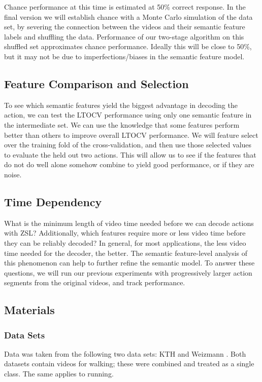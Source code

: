 \documentclass{article}
\begin{document}
Chance performance at this time is estimated at 50\% correct response. In the final version we will establish chance with a Monte Carlo simulation of the data set, by severing the connection between the videos and their semantic feature labels and shuffling the data. Performance of our two-stage algorithm on this shuffled set approximates chance performance. Ideally this will be close to 50\%, but it may not be due to imperfections/biases in the semantic feature model.
\label{stats}

\subsection{Feature Comparison and Selection}
To see which semantic features yield the biggest advantage in decoding the action, we can test the LTOCV performance using only one semantic feature in the intermediate set. We can use the knowledge that some features perform better than others to improve overall LTOCV performance. We will feature select over the training fold of the cross-validation, and then use those selected values to evaluate the held out two actions. This will allow us to see if the features that do not do well alone somehow combine to yield good performance, or if they are noise.
\label{fcomp}

\subsection{Time Dependency}
What is the minimum length of video time needed before we can decode actions with ZSL? Additionally, which features require more or less video time before they can be reliably decoded? In general, for most applications, the less video time needed for the decoder, the better. The semantic feature-level analysis of this phenomenon can help to further refine the semantic model. To answer these questions, we will run our previous experiments with progressively larger action segments from the original videos, and track performance.
\label{time}

\subsection{Materials}
\subsubsection{Data Sets}
Data was taken from the following two data sets: KTH \cite{kth} and Weizmann \cite{weizmann}. Both datasets contain videos for walking; these were combined and treated as a single class. The same applies to running.
\end{document}
